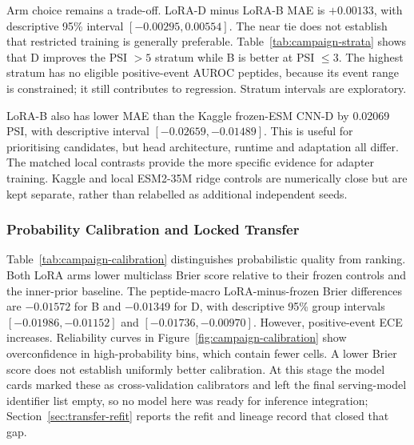 Arm choice remains a trade-off. LoRA-D minus LoRA-B MAE is $+0.00133$, with descriptive 95\%
interval $[-0.00295,0.00554]$. The near tie does not establish that restricted training is generally
preferable. Table~\ref{tab:campaign-strata} shows that D improves the PSI $>5$ stratum while B is
better at PSI $\le3$. The highest stratum has no eligible positive-event AUROC peptides, because
its event range is constrained; it still contributes to regression. Stratum intervals are exploratory.

\begin{table}[htbp]
  \centering
  \caption[LoRA peptide-macro MAE by WT-PSI stratum]{LoRA peptide-macro MAE by WT-PSI stratum. The final column is the paired D-minus-B
  difference with a descriptive 95\% protein-group interval; $n$ counts peptides.}
  \label{tab:campaign-strata}
  
\end{table}

LoRA-B also has lower MAE than the Kaggle frozen-ESM CNN-D by 0.02069 PSI, with descriptive
interval $[-0.02659,-0.01489]$. This is useful for prioritising candidates, but head architecture,
runtime and adaptation all differ. The matched local contrasts provide the more specific evidence
for adapter training. Kaggle and local ESM2-35M ridge controls are numerically close but are kept
separate, rather than relabelled as additional independent seeds.



\subsubsection{Probability Calibration and Locked Transfer}\label{sec:campaign-calibration-transfer}
Table~\ref{tab:campaign-calibration} distinguishes probabilistic quality from ranking. Both LoRA
arms lower multiclass Brier score relative to their frozen controls and the inner-prior baseline.
The peptide-macro LoRA-minus-frozen Brier differences are $-0.01572$ for B and $-0.01349$ for D,
with descriptive 95\% group intervals $[-0.01986,-0.01152]$ and $[-0.01736,-0.00970]$.
However, positive-event ECE increases. Reliability curves in Figure~\ref{fig:campaign-calibration}
show overconfidence in high-probability bins, which contain fewer cells. A lower Brier score does
not establish uniformly better calibration. At this stage the model cards marked these as
cross-validation calibrators and left the final serving-model identifier list empty, so no model
here was ready for inference integration; Section~\ref{sec:transfer-refit} reports the refit and
lineage record that closed that gap.

